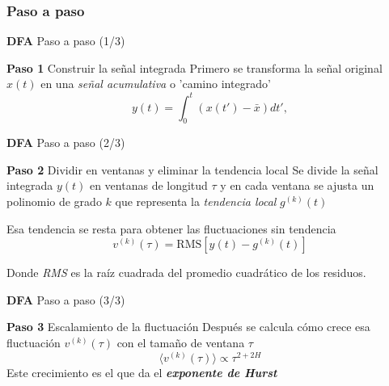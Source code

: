 \documentclass[11pt]{beamer}
\begin{document}
\subsubsection*{Paso a paso}
\begin{frame}{\textbf{DFA} Paso a paso (1/3)}
\begin{block}{\textbf{Paso 1} Construir la señal integrada}
Primero se transforma la señal original $x(t)$ en una \textit{señal acumulativa} o 'camino integrado'
\begin{equation}
y(t) = \int_{0}^{t} (x(t') - \bar{x}) dt',
\end{equation}
\end{block}
\end{frame}

\begin{frame}{\textbf{DFA} Paso a paso (2/3)}
\begin{block}{\textbf{Paso 2} Dividir en ventanas y eliminar la tendencia local}
Se divide la señal integrada $y(t)$ en ventanas de longitud $\tau$ y en cada ventana se ajusta un polinomio de grado $k$ que representa la \textit{tendencia local} $g^{(k)}(t)$

Esa tendencia se resta para obtener las fluctuaciones sin tendencia
\begin{equation}
v^{(k)}(\tau)=\text{RMS}[y(t)-g^{(k)}(t)]
\end{equation}

Donde \textit{RMS} es la raíz cuadrada del promedio cuadrático de los residuos.
\end{block}

\end{frame}


\begin{frame}{\textbf{DFA} Paso a paso (3/3)}
\begin{block}{\textbf{Paso 3} Escalamiento de la fluctuación}
Después se calcula cómo crece esa fluctuación $v^{(k)}(\tau)$ con el tamaño de ventana $\tau$
\begin{equation}
\langle v^{(k)}(\tau) \rangle \propto \tau^{2+2H}
\end{equation}
Este crecimiento es el que da el \textbf{\textit{exponente de Hurst}}
\end{block}
\end{frame}
\end{document}
